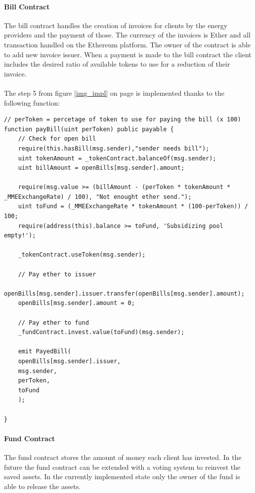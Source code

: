 \documentclass[11pt]{article}
\begin{document}
\paragraph{Bill Contract}
The bill contract handles the creation of invoices for clients by the energy providers and the payment of those. The currency of the invoices is Ether and all transaction handled on the Ethereum platform. The owner of the contract is able to add new invoice issuer. When a payment is made to the bill contract the client includes the desired ratio of available tokens to use for a reduction of their invoice.\\\\

The step 5 from figure \ref{img_impl} on page \pageref{img_impl} is implemented thanks to the following function:
\begin{lstlisting}[language=Solidity, firstnumber=68,caption={src/smartcontracts/contracts/Bill.sol},captionpos=b]
// perToken = percetage of token to use for paying the bill (x 100)
function payBill(uint perToken) public payable {
	// Check for open bill
	require(this.hasBill(msg.sender),"sender needs bill");
	uint tokenAmount = _tokenContract.balanceOf(msg.sender);
	uint billAmount = openBills[msg.sender].amount;

	require(msg.value >= (billAmount - (perToken * tokenAmount * _MMEExchangeRate) / 100), "Not enought ether send.");
	uint toFund = (_MMEExchangeRate * tokenAmount * (100-perToken)) / 100;
	require(address(this).balance >= toFund, 'Subsidizing pool empty!');

	_tokenContract.useToken(msg.sender);

	// Pay ether to issuer
	openBills[msg.sender].issuer.transfer(openBills[msg.sender].amount);
	openBills[msg.sender].amount = 0;

	// Pay ether to fund
	_fundContract.invest.value(toFund)(msg.sender);

	emit PayedBill(
	openBills[msg.sender].issuer,
	msg.sender,
	perToken,
	toFund
	);

}
\end{lstlisting}


\paragraph{Fund Contract}
The fund contract stores the amount of money each client has invested. In the future the fund contract can be extended with a voting system to reinvest the saved assets. In the currently implemented state only the owner of the fund is able to release the assets.\\\\
\end{document}
